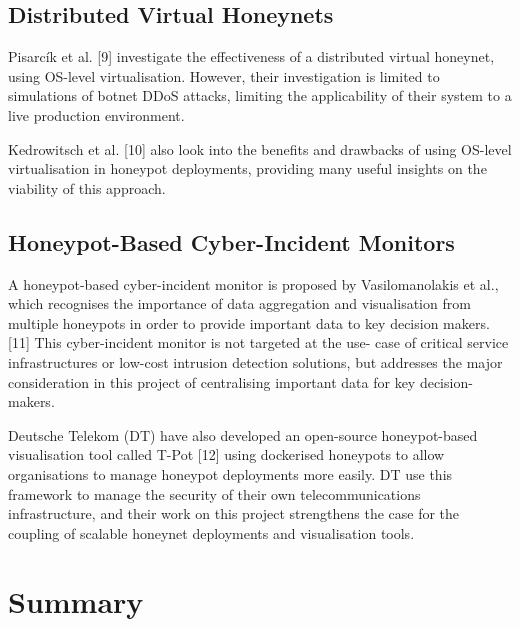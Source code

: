 \subsection{Distributed Virtual Honeynets}

Pisarcík et al. [9] investigate the effectiveness of a distributed virtual honeynet, using OS-level virtualisation. However, their investigation is limited to simulations of botnet DDoS attacks, limiting the applicability of their system to a live production environment. 

Kedrowitsch et al. [10] also look into the benefits and drawbacks of using OS-level virtualisation in honeypot deployments, providing many useful insights on the viability of this approach. 

\subsection{Honeypot-Based Cyber-Incident Monitors}

A honeypot-based cyber-incident monitor is proposed by Vasilomanolakis et al., which recognises the importance of data aggregation and visualisation from multiple honeypots in order to provide important data to key decision makers. [11] This cyber-incident monitor is not targeted at the use- case of critical service infrastructures or low-cost intrusion detection solutions, but addresses the major consideration in this project of centralising important data for key decision-makers. 

Deutsche Telekom (DT) have also developed an open-source honeypot-based visualisation tool called T-Pot [12] using dockerised honeypots to allow organisations to manage honeypot deployments more easily. DT use this framework to manage the security of their own telecommunications infrastructure, and their work on this project strengthens the case for the coupling of scalable honeynet deployments and visualisation tools.  

 

\section{Summary}

